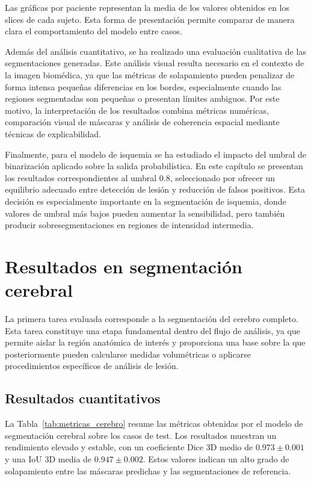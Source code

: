 Las gráficas por paciente representan la media de los valores obtenidos en los slices de cada sujeto. Esta forma de presentación permite comparar de manera clara el comportamiento del modelo entre casos.

Además del análisis cuantitativo, se ha realizado una evaluación cualitativa de las segmentaciones generadas. Este análisis visual resulta necesario en el contexto de la imagen biomédica, ya que las métricas de solapamiento pueden penalizar de forma intensa pequeñas diferencias en los bordes, especialmente cuando las regiones segmentadas son pequeñas o presentan límites ambiguos. Por este motivo, la interpretación de los resultados combina métricas numéricas, comparación visual de máscaras y análisis de coherencia espacial mediante técnicas de explicabilidad.

Finalmente, para el modelo de isquemia se ha estudiado el impacto del umbral de binarización aplicado sobre la salida probabilística. En este capítulo se presentan los resultados correspondientes al umbral 0.8, seleccionado por ofrecer un equilibrio adecuado entre detección de lesión y reducción de falsos positivos. Esta decisión es especialmente importante en la segmentación de isquemia, donde valores de umbral más bajos pueden aumentar la sensibilidad, pero también producir sobresegmentaciones en regiones de intensidad intermedia.

\section{Resultados en segmentación cerebral}
La primera tarea evaluada corresponde a la segmentación del cerebro completo. Esta tarea constituye una etapa fundamental dentro del flujo de análisis, ya que permite aislar la región anatómica de interés y proporciona una base sobre la que posteriormente pueden calcularse medidas volumétricas o aplicarse procedimientos específicos de análisis de lesión.

\subsection{Resultados cuantitativos}
La Tabla~\ref{tab:metricas_cerebro} resume las métricas obtenidas por el modelo de segmentación cerebral sobre los casos de test. Los resultados muestran un rendimiento elevado y estable, con un coeficiente Dice 3D medio de $0.973 \pm 0.001$ y una IoU 3D media de $0.947 \pm 0.002$. Estos valores indican un alto grado de solapamiento entre las máscaras predichas y las segmentaciones de referencia.


